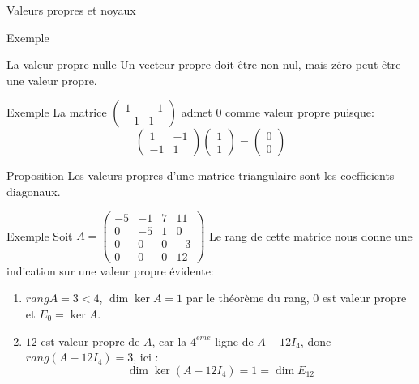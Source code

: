 \begin{parag}{Valeurs propres et noyaux}
\begin{subparag}{Exemple}
\end{subparag}
    \begin{subparag}{La valeur propre nulle}
        Un vecteur propre doit être non nul, mais zéro peut être une valeur propre.
    \end{subparag}
    \begin{subparag}{Exemple}
        La matrice $\begin{pmatrix}
            1 & -1 \\ -1 & 1
        \end{pmatrix}$ admet $0$ comme valeur propre puisque:
        \[\begin{pmatrix}
            1 & -1 \\ -1 & 1
        \end{pmatrix}\begin{pmatrix}
            1 \\ 1
        \end{pmatrix} = \begin{pmatrix}
            0 \\ 0
        \end{pmatrix}\]
    \end{subparag}
    \begin{subparag}{Proposition}
        Les valeurs propres d'une matrice triangulaire sont les coefficients diagonaux.
    \end{subparag}
    \begin{subparag}{Exemple}
        Soit $A = \begin{pmatrix}
            -5 & -1 & 7 & 11\\
            0 & -5  &1 & 0\\
            0 & 0 & 0 & -3\\
            0 & 0 & 0 & 12
        \end{pmatrix}$
        Le rang de cette matrice nous donne une indication sur une valeur propre évidente:
        \begin{enumerate}
            \item $rang A = 3 < 4$, $\dim \ker A = 1$ par le théorème du rang, $0$ est valeur propre et $E_0 = \ker A$.
            \item $12$ est valeur propre de $A$, car la $4^{eme}$ ligne de $A - 12I_4$, donc $rang(A - 12I_4) = 3$, ici : 
            \[\dim \ker (A - 12 I_4) = 1 = \dim E_{12}\]


\end{enumerate}
\end{subparag}
\end{parag}
